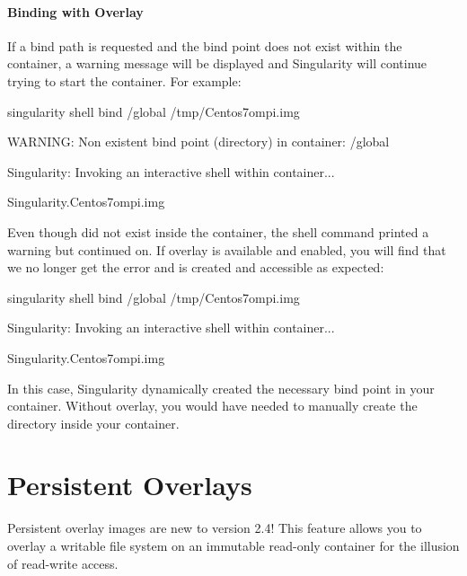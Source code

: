 \documentclass[letterpaper,10pt,english]{sphinxmanual}
\begin{document}
\subsubsection{Binding with Overlay}
\label{\detokenize{bind_paths_and_mounts:binding-with-overlay}}
If a bind path is requested and the bind point does not exist within the
container, a warning message will be displayed and Singularity will
continue trying to start the container. For example:

%
\begin{sphinxVerbatim}[commandchars=\\\{\}]
\PYGZdl{} singularity shell \PYGZhy{}\PYGZhy{}bind /global /tmp/Centos7\PYGZhy{}ompi.img

WARNING: Non existent bind point (directory) in container: \PYGZsq{}/global\PYGZsq{}

Singularity: Invoking an interactive shell within container...


Singularity.Centos7\PYGZhy{}ompi.img\PYGZgt{}
\end{sphinxVerbatim}

Even though  did not exist inside the container, the shell command
printed a warning but continued on. If overlay is available and enabled,
you will find that we no longer get the error and  is created and
accessible as expected:

%
\begin{sphinxVerbatim}[commandchars=\\\{\}]
\PYGZdl{} singularity shell \PYGZhy{}\PYGZhy{}bind /global /tmp/Centos7\PYGZhy{}ompi.img

Singularity: Invoking an interactive shell within container...


Singularity.Centos7\PYGZhy{}ompi.img\PYGZgt{}
\end{sphinxVerbatim}

In this case, Singularity dynamically created the necessary bind point
in your container. Without overlay, you would have needed to manually
create the  directory inside your container.


\chapter{Persistent Overlays}
\label{\detokenize{persistent_overlays:persistent-overlays}}\label{\detokenize{persistent_overlays::doc}}
Persistent overlay images are new to version 2.4! This feature allows
you to overlay a writable file system on an immutable read-only
container for the illusion of read-write access.
\end{document}
